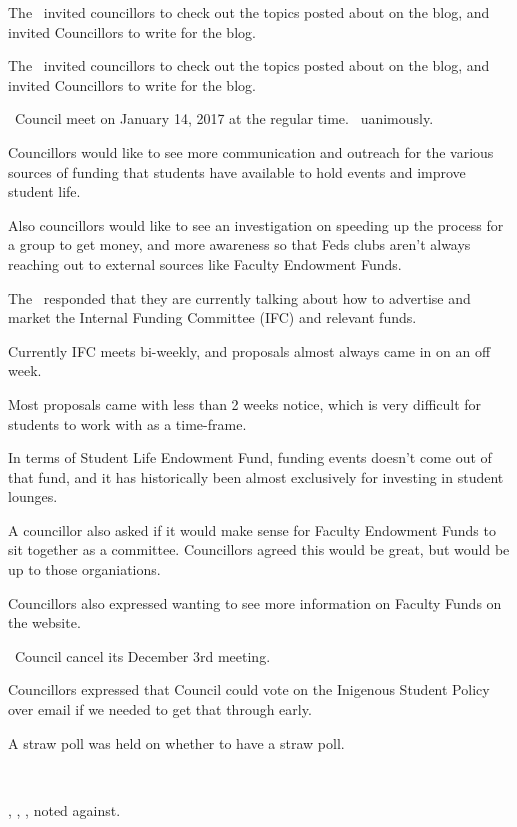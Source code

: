 \begin{information}
    The \vped\ invited councillors to check out the topics posted about on the
    blog, and invited Councillors to write for the blog. 
\end{information}

\begin{information}
    The \vped\ invited councillors to check out the topics posted about on the
    blog, and invited Councillors to write for the blog. 
\end{information}

\begin{motion}
    \birt\ Council meet on January 14, 2017 at the regular time. 
    \movers{\jason}{\brian}
    \carries\ uanimously.
\end{motion}

\begin{information}
    Councillors would like to see more communication and outreach for the 
    various sources of funding that students have available to hold events
    and improve student life. 

    Also councillors would like to see an investigation on speeding up the
    process for a group to get money, and more awareness so that Feds clubs
    aren't always reaching out to external sources like Faculty Endowment 
    Funds. 

    The \vpi\ responded that they are currently talking about how to advertise
    and market the Internal Funding Committee (IFC) and relevant funds. 
    
    Currently IFC meets bi-weekly, and proposals almost always came in on an
    off week.

    Most proposals came with less than 2 weeks notice, which is very difficult
    for students to work with as a time-frame. 

    In terms of Student Life Endowment Fund, funding events doesn't come out
    of that fund, and it has historically been almost exclusively for investing 
    in student lounges.

    A councillor also asked if it would make sense for Faculty Endowment Funds
    to sit together as a committee. Councillors agreed this would be great,
    but would be up to those organiations. 

    Councillors also expressed wanting to see more information on Faculty
    Funds on the website.
    
\end{information}

\heading{}
\begin{information}
    \birt\ Council cancel its December 3rd meeting.
    \movers{\elizebeth}{\seneca}

    Councillors expressed that Council could vote on the 
    Inigenous Student Policy over email if we needed to get that through 
    early.

    A straw poll was held on whether to have a straw poll.

    \carries\

    \jason, \alexander, \stephanie, noted against.
\end{information}
